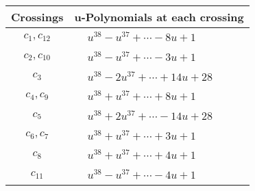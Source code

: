 \documentclass[1p]{elsarticle_modified}
\theoremstyle{definition}
\begin{document}
\begin{tabular}{m{50pt}|m{274pt}}
Crossings & \hspace{64pt}u-Polynomials at each crossing \\
\hline $$\begin{aligned}c_{1},c_{12}\end{aligned}$$&$\begin{aligned}
&u^{38}- u^{37}+\cdots-8 u+1
\end{aligned}$\\
\hline $$\begin{aligned}c_{2},c_{10}\end{aligned}$$&$\begin{aligned}
&u^{38}- u^{37}+\cdots-3 u+1
\end{aligned}$\\
\hline $$\begin{aligned}c_{3}\end{aligned}$$&$\begin{aligned}
&u^{38}-2 u^{37}+\cdots+14 u+28
\end{aligned}$\\
\hline $$\begin{aligned}c_{4},c_{9}\end{aligned}$$&$\begin{aligned}
&u^{38}+u^{37}+\cdots+8 u+1
\end{aligned}$\\
\hline $$\begin{aligned}c_{5}\end{aligned}$$&$\begin{aligned}
&u^{38}+2 u^{37}+\cdots-14 u+28
\end{aligned}$\\
\hline $$\begin{aligned}c_{6},c_{7}\end{aligned}$$&$\begin{aligned}
&u^{38}+u^{37}+\cdots+3 u+1
\end{aligned}$\\
\hline $$\begin{aligned}c_{8}\end{aligned}$$&$\begin{aligned}
&u^{38}+u^{37}+\cdots+4 u+1
\end{aligned}$\\
\hline $$\begin{aligned}c_{11}\end{aligned}$$&$\begin{aligned}
&u^{38}- u^{37}+\cdots-4 u+1
\end{aligned}$\\
\hline
\end{tabular}\\~\\
\end{document}
